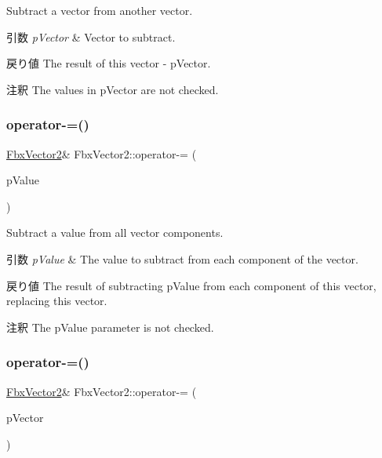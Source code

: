 Subtract a vector from another vector. 
\begin{DoxyParams}{引数}
{\em p\+Vector} & Vector to subtract. \\
\hline
\end{DoxyParams}
\begin{DoxyReturn}{戻り値}
The result of this vector -\/ p\+Vector. 
\end{DoxyReturn}
\begin{DoxyRemark}{注釈}
The values in p\+Vector are not checked. 
\end{DoxyRemark}
\mbox{\label{class_fbx_vector2_a9dd2b74e182efcb4c6ccc83f3aa6b111}} 
\subsubsection{\texorpdfstring{operator-\/=()}{operator-=()}\hspace{0.1cm}{\footnotesize\ttfamily [1/2]}}
{\footnotesize\ttfamily \hyperlink{class_fbx_vector2}{Fbx\+Vector2}\& Fbx\+Vector2\+::operator-\/= (\begin{DoxyParamCaption}\item[{double}]{p\+Value }\end{DoxyParamCaption})}

Subtract a value from all vector components. 
\begin{DoxyParams}{引数}
{\em p\+Value} & The value to subtract from each component of the vector. \\
\hline
\end{DoxyParams}
\begin{DoxyReturn}{戻り値}
The result of subtracting p\+Value from each component of this vector, replacing this vector. 
\end{DoxyReturn}
\begin{DoxyRemark}{注釈}
The p\+Value parameter is not checked. 
\end{DoxyRemark}
\mbox{\label{class_fbx_vector2_a7a84b5172b0bbe90d4eaea8e06b0d7fe}} 
\subsubsection{\texorpdfstring{operator-\/=()}{operator-=()}\hspace{0.1cm}{\footnotesize\ttfamily [2/2]}}
{\footnotesize\ttfamily \hyperlink{class_fbx_vector2}{Fbx\+Vector2}\& Fbx\+Vector2\+::operator-\/= (\begin{DoxyParamCaption}\item[{const \hyperlink{class_fbx_vector2}{Fbx\+Vector2} \&}]{p\+Vector }\end{DoxyParamCaption})}

